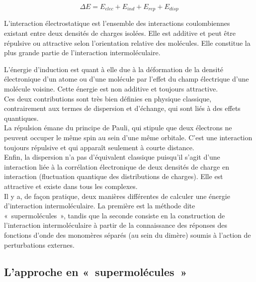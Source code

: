 	\begin{equation}
	\Delta E = E_{elec} + E_{ind} + E_{rep} + E_{disp}
	\end{equation} 
	
	L’interaction électrostatique est l’ensemble des interactions coulombiennes existant entre deux densités de charges isolées. Elle est additive et peut être répulsive ou attractive selon l’orientation relative des molécules. Elle constitue la plus grande partie de l’interaction intermoléculaire. 
	
	L’énergie d’induction est quant à elle due à la déformation de la densité électronique d’un atome ou d’une molécule par l’effet du champ électrique d’une molécule voisine. Cette énergie est non additive et toujours attractive.\\
	
	Ces deux contributions sont très bien définies en physique classique, contrairement aux termes de dispersion et d'échange, qui sont liés à des effets quantiques.\\
	
	La répulsion émane du principe de Pauli, qui stipule que deux électrons ne peuvent occuper le même spin au sein d’une même orbitale. C’est une interaction toujours répulsive et qui apparaît seulement à courte distance.\\
	
	Enfin, la dispersion n’a pas d’équivalent classique puisqu'il s'agit d'une interaction liée à la corrélation électronique de deux densités de charge en interaction (fluctuation quantique des distributions de charges). Elle est attractive et existe dans tous les complexes.\\
	
	Il y a, de façon pratique, deux manières différentes de calculer une énergie d’interaction intermoléculaire. La première est la méthode dite « supermolécules », tandis que la seconde consiste en la construction de l’interaction intermoléculaire à partir de la connaissance des réponses des fonctions d’onde des monomères séparés (au sein du dimère) soumis à l’action de perturbations externes.\\
	
	\subsection{L’approche en « supermolécules »}
	
